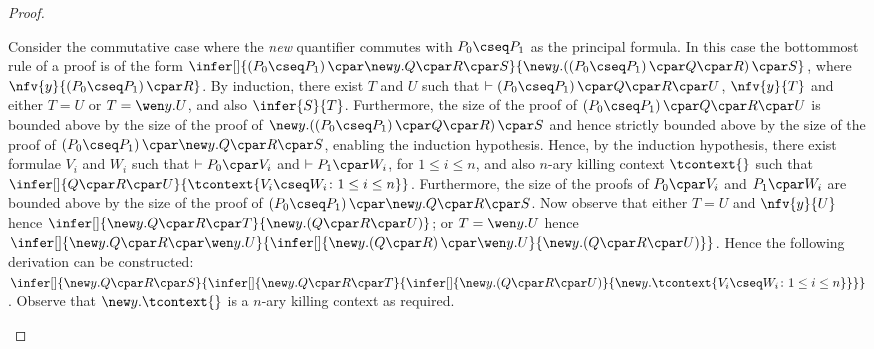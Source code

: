 \documentclass[UKenglish,acmsmall,authorversion]{acmart}
\theoremstyle{plain}
\begin{document}
{\begin{proof}
\begin{enumerate}[label=\textbf{\Alph*},ref=\Alph*,leftmargin=*]
{Consider the commutative case where the \textit{new} quantifier commutes with $P_0 \cseq P_1$ as the principal formula.
In this case the bottommost rule of a proof is of the form $
\infer[]{
\left( P_0 \cseq P_1 \right) \cpar \new y. Q \cpar R \cpar S 
}{
\mathopen{\new y.} \left( \left( P_0 \cseq P_1 \right) \cpar Q \cpar R\right) \cpar S
}$,
where $\nfv{y}{\left( P_0 \cseq P_1 \right) \cpar R}$.
By induction, there exist $T$ and $U$ such that $\vdash \left( P_0 \cseq P_1 \right) \cpar Q \cpar R \cpar U$, $\nfv{y}{T}$ and either $T = U$ or $T = \wen y. U$, and also
$\infer{S}{T}$.
%
Furthermore, the size of the proof of $\left( P_0 \cseq P_1 \right) \cpar Q \cpar R \cpar U$ is bounded above by the size of the proof of $\mathopen{\new y.} \left( \left( P_0 \cseq P_1 \right) \cpar Q \cpar R\right) \cpar S$ and hence strictly bounded above by the size of the proof of $\left( P_0 \cseq P_1 \right) \cpar \new y. Q \cpar R \cpar S$, enabling the induction hypothesis.
Hence, by the induction hypothesis, there exist formulae $V_i$ and $W_i$ such that $\vdash P_0 \cpar V_i$ and $\vdash P_1 \cpar W_i$, for $1 \leq i \leq n$, and also $n$-ary killing context $\tcontext{}$ such that
$\infer[]{
Q \cpar R \cpar U
}{
\tcontext{ V_i \cseq W_i \colon 1 \leq i \leq n }
}$.
Furthermore, the size of the proofs of $P_0 \cpar V_i$ and $P_1 \cpar W_i$ are bounded above by the size of the proof of $\left( P_0 \cseq P_1 \right) \cpar \new y. Q \cpar R \cpar S$.
%
Now observe that either $T = U$ and $\nfv{y}{U}$ hence
$
\infer[]{
\new y. Q \cpar R \cpar T
}{
\mathopen{\new y.} \left(Q \cpar R \cpar U\right)
}$;
or $T = \wen y. U$ hence $
\infer[]{
\new y. Q \cpar R \cpar \wen y. U
}{
\infer[]{
 \mathopen{\new y.} \left(Q \cpar R\right) \cpar \wen y. U 
}{ \mathopen{\new y.} \left(Q \cpar R \cpar U\right)
}}$.
Hence the following derivation can be constructed:
$
\infer[]{
\new y. Q \cpar R \cpar S
}{
\infer[]{
\new y. Q \cpar R \cpar T
}{
\infer[]{
\mathopen{\new y.} \left( Q \cpar R \cpar U \right)
}{
\new y. \tcontext{ V_i \cseq W_i \colon 1 \leq i \leq n }
}}}
$.
Observe that $\new y. \tcontext{ }$ is a $n$-ary killing context as required.
\smallskip


}
\end{enumerate}
\end{proof}}
\end{document}
